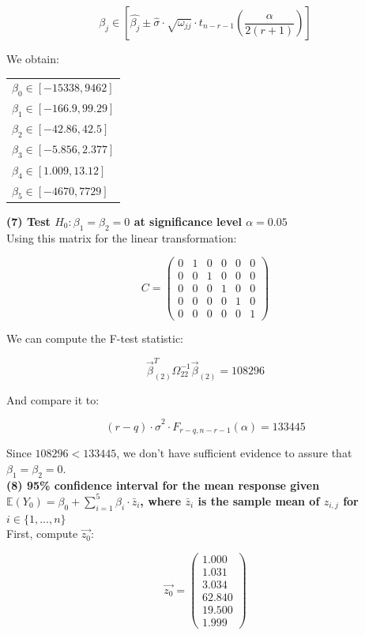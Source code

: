 \documentclass[11pt,a4paper]{article}
\begin{document}
	$$ \beta_j \in [ \hat{\beta_j} \pm \hat{\sigma} \cdot \sqrt{\omega_{jj}} \cdot t_{n-r-1}(\frac{\alpha}{2(r+1)}) ] $$
	
	We obtain:
	
	\begin{table}[H] \centering
		\begin{tabular}{l}
			$\beta_0 \in [ -15338 , 9462 ]$ \\
			$\beta_1 \in [ -166.9 , 99.29 ]$ \\
			$\beta_2 \in [ -42.86 , 42.5 ]$ \\
			$\beta_3 \in [ -5.856 , 2.377 ]$ \\
			$\beta_4 \in [ 1.009 , 13.12 ]$ \\
			$\beta_5 \in [ -4670 , 7729 ]$
		\end{tabular}
	\end{table}
	
	\textbf{(7) Test $H_0: \beta_1 = \beta_2 = 0 $ at significance level $\alpha = 0.05$} \\
	
	Using this matrix for the linear transformation:
	
	$$ C = 
	\begin{pmatrix}
		0 & 1 & 0 & 0 & 0 & 0 \\
		0 & 0 & 1 & 0 & 0 & 0 \\
		0 & 0 & 0 & 1 & 0 & 0 \\
		0 & 0 & 0 & 0 & 1 & 0 \\
		0 & 0 & 0 & 0 & 0 & 1
	\end{pmatrix}
	$$
	
	We can compute the F-test statistic:
	
	$$ \vec{\beta}^T_{(2)} \Omega_{22}^{-1} \vec{\beta}_{(2)} = 108296 $$
	
	And compare it to:
	
	$$ (r-q) \cdot \hat{\sigma}^2 \cdot F_{r-q,n-r-1}(\alpha) = 133445 $$
	
	Since $108296 < 133445$, we don't have sufficient evidence to assure that $\beta_1 = \beta_2 = 0$. \\
	
	\textbf{(8) 95\% confidence interval for the mean response given $\mathds{E}(Y_0) = \beta_0 + \sum_{i=1}^{5} \beta_i \cdot \bar{z}_i$, where $\bar{z}_i$ is the sample mean of $z_{i,j}$ for $i \in \{1, ..., n\}$} \\
	
	First, compute $\vec{z_0}$:
	
	$$ \vec{z_0} = 
	\begin{pmatrix}
		1.000  \\
		1.031  \\
		3.034  \\
		62.840 \\
		19.500 \\
		1.999 
	\end{pmatrix} 
	$$
	
\end{document}
